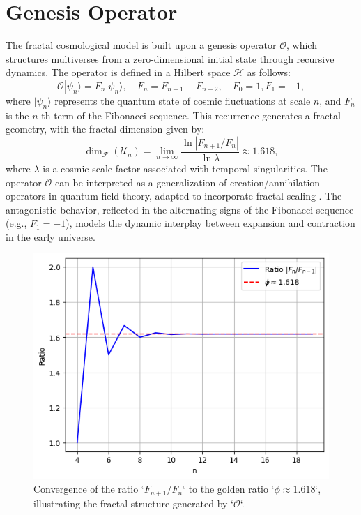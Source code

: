 \documentclass[aps,prl,twocolumn,groupedaddress]{revtex4-2}
\begin{document}
\section{Genesis Operator}
The fractal cosmological model is built upon a genesis operator \(\mathcal{O}\), which structures multiverses from a zero-dimensional initial state through recursive dynamics. The operator is defined in a Hilbert space \(\mathcal{H}\) as follows:
\begin{equation}
\mathcal{O} |\psi_n\rangle = F_n |\psi_n\rangle, \quad F_n = F_{n-1} + F_{n-2}, \quad F_0 = 1, F_1 = -1,
\end{equation}
where \(|\psi_n\rangle\) represents the quantum state of cosmic fluctuations at scale \(n\), and \(F_n\) is the \(n\)-th term of the Fibonacci sequence. This recurrence generates a fractal geometry, with the fractal dimension given by:
\begin{equation}
\dim_{\mathscr{F}}(\mathcal{U}_n) = \lim_{n \to \infty} \frac{\ln |F_{n+1}/F_n|}{\ln \lambda} \approx 1.618,
\end{equation}
where \(\lambda\) is a cosmic scale factor associated with temporal singularities. The operator \(\mathcal{O}\) can be interpreted as a generalization of creation/annihilation operators in quantum field theory, adapted to incorporate fractal scaling \cite{Nottale1993}. The antagonistic behavior, reflected in the alternating signs of the Fibonacci sequence (e.g., \(F_1 = -1\)), models the dynamic interplay between expansion and contraction in the early universe.

\begin{figure}
\centering
\includegraphics[width=\columnwidth]{figures/fibonacci_ratio.png}
\caption{Convergence of the ratio `\(F_{n+1}/F_n\)` to the golden ratio `\(\phi \approx 1.618\)`, illustrating the fractal structure generated by `\(\mathcal{O}\)`.}
\label{fig:fibonacci_ratio}
\end{figure}
\end{document}
